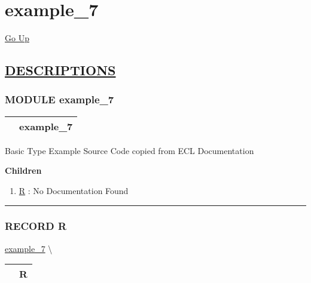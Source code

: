 \chapter*{\color{headfile}
example_7
}
\hypertarget{ecldoc:toc:example_7}{}
\hyperlink{ecldoc:toc:root}{Go Up}


\section*{\underline{\textsf{DESCRIPTIONS}}}
\subsection*{\textsf{\colorbox{headtoc}{\color{white} MODULE}
example\_7}}

\hypertarget{ecldoc:example_7}{}

{\renewcommand{\arraystretch}{1.5}
\begin{tabularx}{\textwidth}{|>{\raggedright\arraybackslash}l|X|}
\hline
\hspace{0pt}\mytexttt{\color{red} } & \textbf{example\_7} \\
\hline
\end{tabularx}
}

\par





Basic Type Example Source Code copied from ECL Documentation







\textbf{Children}
\begin{enumerate}
\item \hyperlink{ecldoc:example_7.r}{R}
: No Documentation Found
\end{enumerate}

\rule{\linewidth}{0.5pt}

\subsection*{\textsf{\colorbox{headtoc}{\color{white} RECORD}
R}}

\hypertarget{ecldoc:example_7.r}{}
\hspace{0pt} \hyperlink{ecldoc:example_7}{example_7} \textbackslash 

{\renewcommand{\arraystretch}{1.5}
\begin{tabularx}{\textwidth}{|>{\raggedright\arraybackslash}l|X|}
\hline
\hspace{0pt}\mytexttt{\color{red} } & \textbf{R} \\
\hline
\end{tabularx}
}

